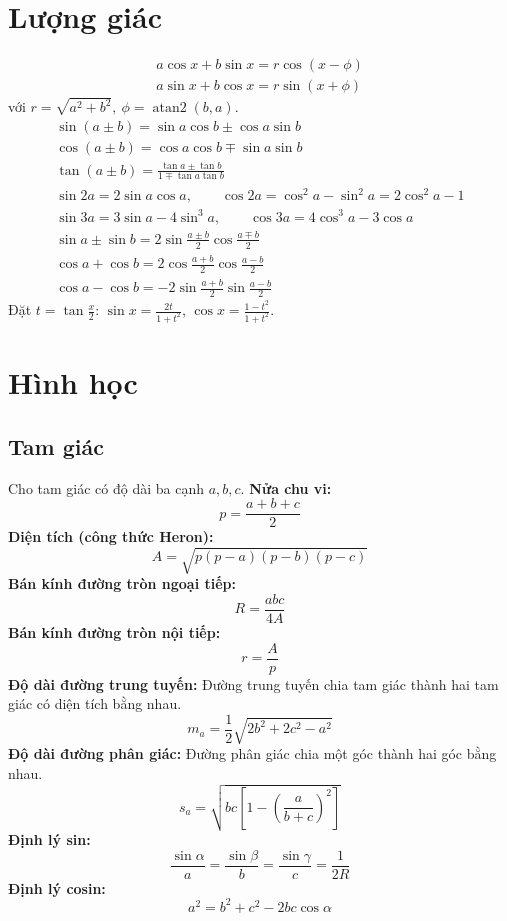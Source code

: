 \section{Lượng giác}
\begin{gather*}
    a\cos x+b\sin x=r\cos(x-\phi)\\
    a\sin x+b\cos x=r\sin(x+\phi)
\end{gather*}
với $r=\sqrt{a^2+b^2},\ \phi=\operatorname{atan2}(b,a)$.
\begin{gather*}
    \sin(a\pm b)=\sin a\cos b\pm\cos a\sin b\\
    \cos(a\pm b)=\cos a\cos b\mp\sin a\sin b\\
    \tan(a\pm b)=\frac{\tan a\pm\tan b}{1\mp\tan a\tan b}\\
    \sin 2a=2\sin a\cos a,\qquad
    \cos 2a=\cos^2 a-\sin^2 a=2\cos^2 a-1\\
    \sin 3a=3\sin a-4\sin^3 a,\qquad
    \cos 3a=4\cos^3 a-3\cos a\\
    \sin a\pm\sin b=2\sin\frac{a\pm b}{2}\cos\frac{a\mp b}{2}\\
    \cos a+\cos b=2\cos\frac{a+b}{2}\cos\frac{a-b}{2}\\
    \cos a-\cos b=-2\sin\frac{a+b}{2}\sin\frac{a-b}{2}
\end{gather*}
Đặt $t=\tan\frac{x}{2}$: $\sin x=\frac{2t}{1+t^2}$,
$\cos x=\frac{1-t^2}{1+t^2}$.

\section{Hình học}

\subsection{Tam giác}

Cho tam giác có độ dài ba cạnh $a,b,c$.
\textbf{Nửa chu vi:}
\[
    p = \frac{a+b+c}{2}
\]
\textbf{Diện tích (công thức Heron):}
\[
    A = \sqrt{p(p-a)(p-b)(p-c)}
\]
\textbf{Bán kính đường tròn ngoại tiếp:}
\[
    R = \frac{abc}{4A}
\]
\textbf{Bán kính đường tròn nội tiếp:}
\[
    r = \frac{A}{p}
\]
\textbf{Độ dài đường trung tuyến:}
Đường trung tuyến chia tam giác thành hai tam giác có diện tích bằng nhau.
\[
    m_a = \frac{1}{2}\sqrt{2b^2+2c^2-a^2}
\]
\textbf{Độ dài đường phân giác:}
Đường phân giác chia một góc thành hai góc bằng nhau.
\[
    s_a = \sqrt{bc\left[1-\left(\frac{a}{b+c}\right)^2\right]}
\]
\textbf{Định lý sin:}
\[
    \frac{\sin\alpha}{a}
    = \frac{\sin\beta}{b}
    = \frac{\sin\gamma}{c}
    = \frac{1}{2R}
\]
\textbf{Định lý cosin:}
\[
    a^2 = b^2+c^2-2bc\cos\alpha
\]

